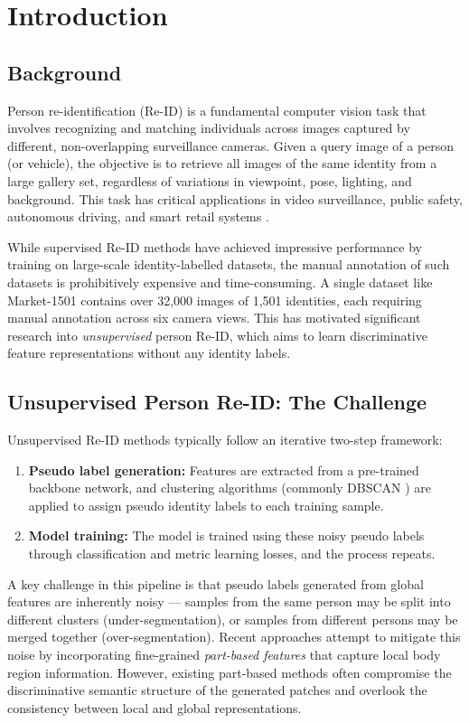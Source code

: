 \chapter{Introduction}

\section{Background}

Person re-identification (Re-ID) is a fundamental computer vision task that involves recognizing and matching individuals across images captured by different, non-overlapping surveillance cameras. Given a query image of a person (or vehicle), the objective is to retrieve all images of the same identity from a large gallery set, regardless of variations in viewpoint, pose, lighting, and background. This task has critical applications in video surveillance, public safety, autonomous driving, and smart retail systems \cite{zheng2015scalable}.

While supervised Re-ID methods have achieved impressive performance by training on large-scale identity-labelled datasets, the manual annotation of such datasets is prohibitively expensive and time-consuming. A single dataset like Market-1501 contains over 32,000 images of 1,501 identities, each requiring manual annotation across six camera views. This has motivated significant research into \textit{unsupervised} person Re-ID, which aims to learn discriminative feature representations without any identity labels.

\section{Unsupervised Person Re-ID: The Challenge}

Unsupervised Re-ID methods typically follow an iterative two-step framework:
\begin{enumerate}
    \item \textbf{Pseudo label generation:} Features are extracted from a pre-trained backbone network, and clustering algorithms (commonly DBSCAN \cite{ester1996dbscan}) are applied to assign pseudo identity labels to each training sample.
    \item \textbf{Model training:} The model is trained using these noisy pseudo labels through classification and metric learning losses, and the process repeats.
\end{enumerate}

A key challenge in this pipeline is that pseudo labels generated from global features are inherently noisy --- samples from the same person may be split into different clusters (under-segmentation), or samples from different persons may be merged together (over-segmentation). Recent approaches attempt to mitigate this noise by incorporating fine-grained \textit{part-based features} that capture local body region information. However, existing part-based methods often compromise the discriminative semantic structure of the generated patches and overlook the consistency between local and global representations.

